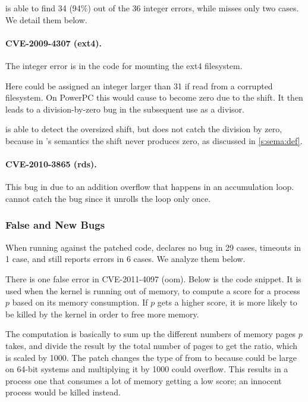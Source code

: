 \sys is able to find 34 (94\%) out of the 36 integer errors, while
misses only two cases.  We detail them below.

\paragraph{CVE-2009-4307 (ext4).}
The integer error is in the code for mounting the ext4 filesystem.

Here  could be assigned an integer
larger than 31 if read from a corrupted filesystem.  On PowerPC
this would cause  to become zero due to the
shift.  It then leads to a division-by-zero bug in the subsequent
use as a divisor.

\sys is able to detect the oversized shift, but does not catch the
division by zero, because in \sys's semantics the shift never
produces zero, as discussed in \autoref{s:sema:def}.

\paragraph{CVE-2010-3865 (rds).}
This bug in due to an addition overflow that happens in an accumulation
loop.  \sys cannot catch the bug since it unrolls the loop only
once.

\subsubsection{False and New Bugs}

When running against the patched code, \sys declares no bug in 29
cases, timeouts in 1 case, and still reports errors in 6 cases.
We analyze them below.

There is one false error in CVE-2011-4097 (oom).  Below is the code
snippet.  It is used when the kernel is running out of memory, to
compute a score for a process $p$ based on its memory consumption.
If $p$ gets a higher score, it is more likely to be killed by the
kernel in order to free more memory.

The computation is basically to sum up the different numbers of
memory pages $p$ takes, and divide the result by the total number
of pages to get the ratio, which is scaled by 1000.  The patch
changes the type of  from  to  because
 could be large on 64-bit systems and multiplying it by
1000 could overflow.  This results in a process one that consumes
a lot of memory getting a low score; an innocent process would be
killed instead.

